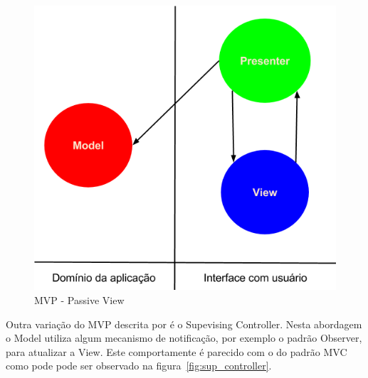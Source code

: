 \documentclass[conference]{IEEEtran}
\begin{document}
\begin{figure}[htb]
	\begin{center}
		\includegraphics[scale=0.5]{img/passive_view.png}
	\end{center}
	\caption{\label{fig:mvp_passive_view} MVP - Passive View}
	
\end{figure}

Outra variação do MVP descrita por  é o Supevising
Controller. Nesta abordagem o Model utiliza algum mecanismo de notificação, por
exemplo o padrão Observer, para atualizar a View. Este comportamente é parecido
com o do padrão MVC como pode pode ser observado na
figura~\ref{fig:sup_controller}.
\end{document}
